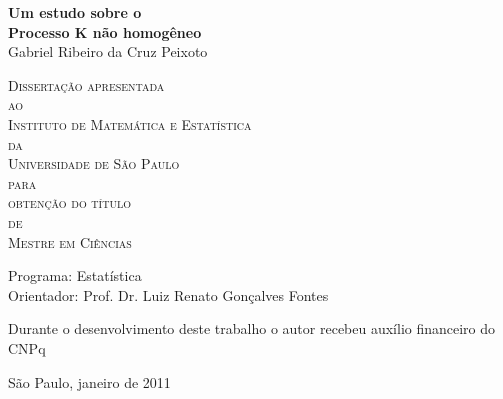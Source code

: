 \documentclass[11pt,twoside,a4paper]{book}
\begin{document}
\frontmatter 
\fancyhead[RO]{{\footnotesize\rightmark}\hspace{2em}\thepage}
\setcounter{tocdepth}{2}
\fancyhead[LE]{\thepage\hspace{2em}\footnotesize{\leftmark}}
\fancyhead[RE,LO]{}
\fancyhead[RO]{{\footnotesize\rightmark}\hspace{2em}\thepage}

\onehalfspacing  %

\thispagestyle{empty}
\begin{center}
  \vspace*{2.3cm}
  \textbf{\Large{Um estudo sobre o\\Processo K não homogêneo}}\\
  
  \vspace*{1.2cm}
  \Large{Gabriel Ribeiro da Cruz Peixoto}
  
  \vskip 2cm
  \textsc{
    Dissertação apresentada\\[-0.25cm] 
    ao\\[-0.25cm]
    Instituto de Matemática e Estatística\\[-0.25cm]
    da\\[-0.25cm]
    Universidade de São Paulo\\[-0.25cm]
    para\\[-0.25cm]
    obtenção do título\\[-0.25cm]
    de\\[-0.25cm]
    Mestre em Ciências}
  
  \vskip 1.5cm
  Programa: Estatística\\
  Orientador: Prof. Dr. Luiz Renato Gonçalves Fontes
  
  \vskip 1cm
  \normalsize{Durante o desenvolvimento deste trabalho o autor recebeu auxílio
    financeiro do CNPq}
  
  \vskip 0.5cm
  \normalsize{São Paulo, janeiro de 2011}
\end{center}

\end{document}
